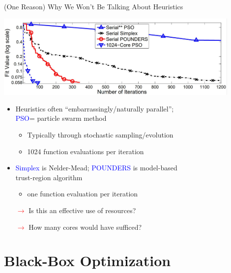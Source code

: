 \documentclass[handout,aspectratio=54]{beamer}
\numberwithin{theorem}{section}
\begin{document}
\begin{frame}{(One Reason) Why We Won’t Be Talking About Heuristics}
\begin{center}
\includegraphics[width=0.9\textwidth]{fig/10.jpg}
\end{center}

\begin{itemize}\scriptsize
\item Heuristics often “embarrassingly/naturally parallel”;\\
\textcolor{blue}{PSO}= particle swarm method
	\begin{itemize}\scriptsize
	\item Typically through stochastic sampling/evolution
	\item 1024 function evaluations per iteration
	\end{itemize}
\item \textcolor{blue}{Simplex} is Nelder-Mead; \textcolor{blue}{POUNDERS} is model-based\\
trust-region algorithm
	\begin{itemize}\scriptsize
	\item one function evaluation per iteration
	\end{itemize}
\item [\textcolor{red}{$\rightarrow$}] Is this an effective use of resources?
\item [\textcolor{red}{$\rightarrow$}] How many cores would have sufficed?
\end{itemize}
\end{frame}

\section{Black-Box Optimization}
\end{document}
